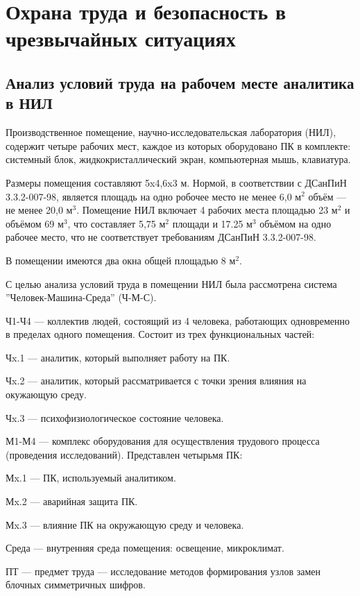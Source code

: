 \chapter{Охрана труда и безопасность в чрезвычайных ситуациях}

\section{Анализ условий труда на рабочем месте аналитика в НИЛ}

Производственное помещение, научно-исследовательская лаборатория (НИЛ), содержит
четыре рабочих мест, каждое из которых оборудовано ПК в комплекте: системный
блок, жидкокристаллический экран, компьютерная мышь, клавиатура.

Размеры помещения составляют 5x4,6x3 м. Нормой, в соответствии с ДСанПиН
3.3.2-007-98, является площадь на одно робочее место не менее 6,0 $\text{м}^2$
объём --- не менее 20,0 $\text{м}^3$. Помещение НИЛ включает 4 рабочих места
площадью 23 $\text{м}^2$ и объёмом 69 $\text{м}^3$, что составляет 5,75
$\text{м}^2$ площади и 17.25 $\text{м}^3$ объёмом на одно рабочее место, что не
соответствует требованиям ДСанПиН 3.3.2-007-98.

В помещении имеются два окна общей площадью 8 $\text{м}^2$.

С целью анализа условий труда в помещении НИЛ была рассмотрена система
''Человек-Машина-Среда'' (Ч-М-С).

Ч1-Ч4 --- коллектив людей, состоящий из 4 человека, работающих одновременно в
пределах одного помещения. Состоит из трех функциональных частей:

Чx.1 --- аналитик, который выполняет работу на ПК.

Чx.2 --- аналитик, который рассматривается с точки зрения влияния на окужающую
среду.

Чx.3 --- психофизиологическое состояние человека.

М1-М4 --- комплекс оборудования для осуществления трудового процесса (проведения
исследований). Представлен четырьмя ПК:

Мx.1 --- ПК, используемый аналитиком.

Мx.2 --- аварийная защита ПК.

Мx.3 --- влияние ПК на окружающую среду и человека.

Среда --- внутренняя среда помещения: освещение, микроклимат.

ПТ --- предмет труда --- исследование методов формирования узлов замен блочных
симметричных шифров.

